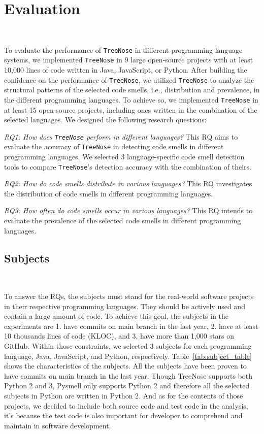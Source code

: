 \section{Evaluation}~\label{sec:evaluation}

To evaluate the performance of \texttt{TreeNose} in different programming
language systems, we implemented \texttt{TreeNose} in 9 large open-source
projects with at least 10,000 lines of code written in Java, JavaScript, or
Python. After building the confidence on the performance of \texttt{TreeNose},
we utilized \texttt{TreeNose} to analyze the structural patterns of the
selected code smells, i.e., distribution and prevalence, in the different
programming languages. To achieve so, we implemented \texttt{TreeNose} in at
least 15 open-source projects, including ones written in the combination of the
selected languages. We designed the following research questions:

{\it RQ1: How does \texttt{TreeNose} perform in different languages?} This RQ
aims to evaluate the accuracy of \texttt{TreeNose} in detecting code smells in
different programming languages. We selected 3 language-specific code smell
detection tools to compare \texttt{TreeNose}'s detection accuracy with the
combination of theirs.

{\it RQ2: How do code smells distribute in various languages?} This RQ
investigates the distribution of code smells in different programming
languages.

{\it RQ3: How often do code smells occur in various languages?} This RQ intends
to evaluate the prevalence of the selected code smells in different programming
languages.

\subsection{Subjects}~\label{sec:subjects}

To answer the RQs, the subjects must stand for the real-world software projects
in their respective programming languages. They should be actively used and
contain a large amount of code. To achieve this goal, the subjects in the
experiments are 1. have commits on main branch in the last year, 2. have at
least 10 thousands lines of code (KLOC), and 3. have more than 1,000 stars on
GitHub. Within those constraints, we selected 3 subjects for each programming
language, Java, JavaScript, and Python, respectively.
Table~\ref{tab:subject_table} shows the characteristics of the subjects. All
the subjects have been proven to have commits on main branch in the last year.
Though TreeNose supports both Python 2 and 3, Pysmell only supports Python 2
and therefore all the selected subjects in Python are written in Python 2. And
as for the contents of those projects, we decided to include both source code
and test code in the analysis, it's because the test code is also important for
developer to comprehend and maintain in software development.


